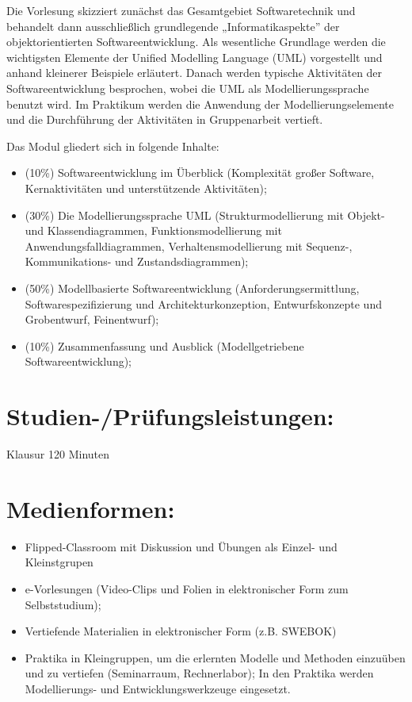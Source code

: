 Die Vorlesung skizziert zunächst das Gesamtgebiet Softwaretechnik und
behandelt dann ausschließlich grundlegende „Informatikaspekte'' der
objektorientierten Softwareentwicklung. Als wesentliche Grundlage werden
die wichtigsten Elemente der Unified Modelling Language (UML)
vorgestellt und anhand kleinerer Beispiele erläutert. Danach werden
typische Aktivitäten der Softwareentwicklung besprochen, wobei die UML
als Modellierungssprache benutzt wird. Im Praktikum werden die Anwendung
der Modellierungselemente und die Durchführung der Aktivitäten in
Gruppenarbeit vertieft.

Das Modul gliedert sich in folgende Inhalte:

\begin{itemize}
\item
  (10\%) Softwareentwicklung im Überblick (Komplexität großer Software,
  Kernaktivitäten und unterstützende Aktivitäten);
\item
  (30\%) Die Modellierungssprache UML (Strukturmodellierung mit Objekt-
  und Klassendiagrammen, Funktionsmodellierung mit
  Anwendungsfalldiagrammen, Verhaltensmodellierung mit Sequenz-,
  Kommunikations- und Zustandsdiagrammen);
\item
  (50\%) Modellbasierte Softwareentwicklung (Anforderungsermittlung,
  Softwarespezifizierung und Architekturkonzeption, Entwurfskonzepte und
  Grobentwurf, Feinentwurf);
\item
  (10\%) Zusammenfassung und Ausblick (Modellgetriebene
  Softwareentwicklung);
\end{itemize}

\section*{Studien-/Prüfungsleistungen:}\label{studien-pruxfcfungsleistungen-20}

Klausur 120 Minuten

\section*{Medienformen:}\label{medienformen-13}

\begin{itemize}
\item
  Flipped-Classroom mit Diskussion und Übungen als Einzel- und
  Kleinstgrupen
\item
  e-Vorlesungen (Video-Clips und Folien in elektronischer Form zum
  Selbststudium);
\item
  Vertiefende Materialien in elektronischer Form (z.B. SWEBOK)
\item
  Praktika in Kleingruppen, um die erlernten Modelle und Methoden
  einzuüben und zu vertiefen (Seminarraum, Rechnerlabor); In den
  Praktika werden Modellierungs- und Entwicklungswerkzeuge eingesetzt.
\end{itemize}

